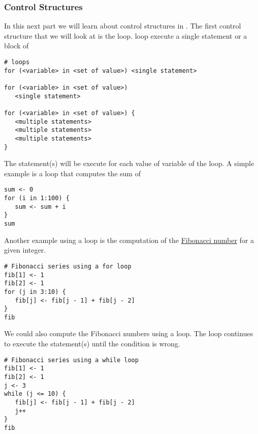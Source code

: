 \subsubsection{Control Structures}
In this next part we will learn about control structures in \Rev. 
The first control structure that we will look at is the  loop.
 loop execute a single statement or a block of 
{\tt \begin{snugshade*}
\begin{lstlisting}    
# loops
for (<variable> in <set of value>) <single statement>
 
for (<variable> in <set of value>) 
   <single statement>

for (<variable> in <set of value>) {
   <multiple statements>
   <multiple statements>
   <multiple statements>
}
\end{lstlisting}
\end{snugshade*}}
The statement(s) will be execute for each value of variable of the  loop.
A simple example is a  loop that computes the sum of 
{\tt \begin{snugshade*}
\begin{lstlisting}    
sum <- 0
for (i in 1:100) {
   sum <- sum + i
}
sum
\end{lstlisting}
\end{snugshade*}}
Another example using a  loop is the computation of the \href{http://en.wikipedia.org/wiki/Fibonacci_number}{Fibonacci number} for a given integer. 
{\tt \begin{snugshade*}
\begin{lstlisting}    
# Fibonacci series using a for loop
fib[1] <- 1
fib[2] <- 1
for (j in 3:10) {
   fib[j] <- fib[j - 1] + fib[j - 2]
}
fib
\end{lstlisting}
\end{snugshade*}}
We could also compute the Fibonacci numbers using a  loop.
The  loop continues to execute the statement(s) until the condition is wrong.
{\tt \begin{snugshade*}
\begin{lstlisting}    
# Fibonacci series using a while loop
fib[1] <- 1
fib[2] <- 1
j <- 3
while (j <= 10) {
   fib[j] <- fib[j - 1] + fib[j - 2]
   j++
}
fib
\end{lstlisting}
\end{snugshade*}}

